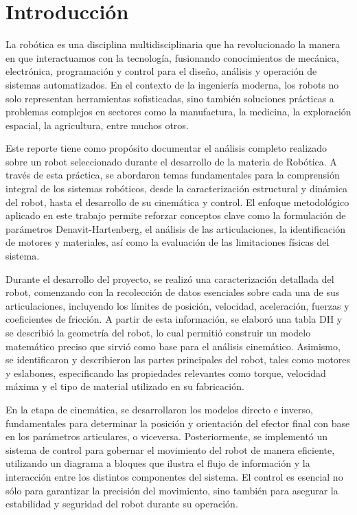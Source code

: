 \chapter{Introducción} \label{chap:introduccion}

La robótica es una disciplina multidisciplinaria que ha revolucionado la manera en que interactuamos con la tecnología, fusionando conocimientos de mecánica, electrónica, programación y control para el diseño, análisis y operación de sistemas automatizados. En el contexto de la ingeniería moderna, los robots no solo representan herramientas sofisticadas, sino también soluciones prácticas a problemas complejos en sectores como la manufactura, la medicina, la exploración espacial, la agricultura, entre muchos otros.

Este reporte tiene como propósito documentar el análisis completo realizado sobre un robot seleccionado durante el desarrollo de la materia de Robótica. A través de esta práctica, se abordaron temas fundamentales para la comprensión integral de los sistemas robóticos, desde la caracterización estructural y dinámica del robot, hasta el desarrollo de su cinemática y control. El enfoque metodológico aplicado en este trabajo permite reforzar conceptos clave como la formulación de parámetros Denavit-Hartenberg, el análisis de las articulaciones, la identificación de motores y materiales, así como la evaluación de las limitaciones físicas del sistema.

Durante el desarrollo del proyecto, se realizó una caracterización detallada del robot, comenzando con la recolección de datos esenciales sobre cada una de sus articulaciones, incluyendo los límites de posición, velocidad, aceleración, fuerzas y coeficientes de fricción. A partir de esta información, se elaboró una tabla DH y se describió la geometría del robot, lo cual permitió construir un modelo matemático preciso que sirvió como base para el análisis cinemático. Asimismo, se identificaron y describieron las partes principales del robot, tales como motores y eslabones, especificando las propiedades relevantes como torque, velocidad máxima y el tipo de material utilizado en su fabricación.

En la etapa de cinemática, se desarrollaron los modelos directo e inverso, fundamentales para determinar la posición y orientación del efector final con base en los parámetros articulares, o viceversa. Posteriormente, se implementó un sistema de control para gobernar el movimiento del robot de manera eficiente, utilizando un diagrama a bloques que ilustra el flujo de información y la interacción entre los distintos componentes del sistema. El control es esencial no sólo para garantizar la precisión del movimiento, sino también para asegurar la estabilidad y seguridad del robot durante su operación.

